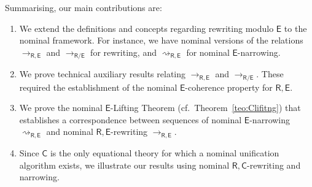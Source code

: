 \documentclass[submission,copyright,creativecommons]{eptcs}
\newcommand{\caleq}{\approx_{\alpha,\theory{C}}}
\newcommand{\dani}[1]{\textcolor{orange}{#1}}
\newcommand{\theory}[1]{\ensuremath{\mathsf{#1}}}
\theoremstyle{plain}
\theoremstyle{definition}
\theoremstyle{remark}
\begin{document}
Summarising, our main contributions are:
\begin{enumerate}
 \item We extend the definitions and concepts regarding rewriting modulo $\theory{E}$ to the nominal framework. For instance, we have nominal versions of the relations $\to_{\theory{R,E}}$ and $\to_{\theory{R/E}}$ for rewriting, and $\rightsquigarrow_\theory{R,E}$ for nominal \theory{E}-narrowing.
 \item We prove technical auxiliary results relating $\to_{\theory{R,E}}$ and $\to_{\theory{R/E}}$. These required the establishment of the nominal \theory{E}-coherence property for ${\theory{R,E}}$.
 \item We  prove the nominal \theory{E}-Lifting Theorem (cf.\ Theorem~\ref{teo:Clifitng}) that establishes a correspondence between sequences of nominal \theory{E}-narrowing  $\rightsquigarrow_\theory{R,E}$ and nominal \theory{R,E}-rewriting $\to_{\theory{R,E}}$.
 \item Since $\theory{C}$ is the only equational theory for which a nominal unification algorithm exists, we illustrate our results using nominal $\theory{R,C}$-rewriting and narrowing.
   
\end{enumerate}
\end{document}
